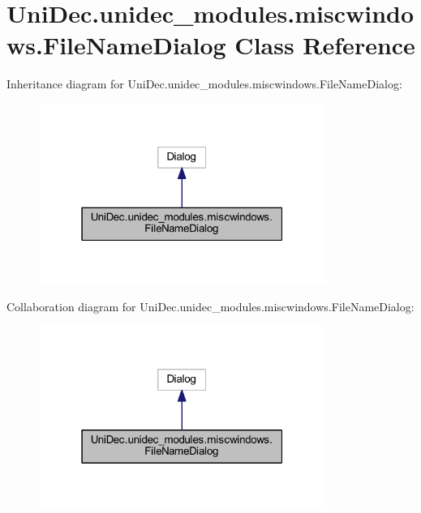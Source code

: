 \hypertarget{class_uni_dec_1_1unidec__modules_1_1miscwindows_1_1_file_name_dialog}{}\section{Uni\+Dec.\+unidec\+\_\+modules.\+miscwindows.\+File\+Name\+Dialog Class Reference}
\label{class_uni_dec_1_1unidec__modules_1_1miscwindows_1_1_file_name_dialog}


Inheritance diagram for Uni\+Dec.\+unidec\+\_\+modules.\+miscwindows.\+File\+Name\+Dialog\+:\nopagebreak
\begin{figure}[H]
\begin{center}
\leavevmode
\includegraphics[width=265pt]{class_uni_dec_1_1unidec__modules_1_1miscwindows_1_1_file_name_dialog__inherit__graph}
\end{center}
\end{figure}


Collaboration diagram for Uni\+Dec.\+unidec\+\_\+modules.\+miscwindows.\+File\+Name\+Dialog\+:\nopagebreak
\begin{figure}[H]
\begin{center}
\leavevmode
\includegraphics[width=265pt]{class_uni_dec_1_1unidec__modules_1_1miscwindows_1_1_file_name_dialog__coll__graph}
\end{center}
\end{figure}
